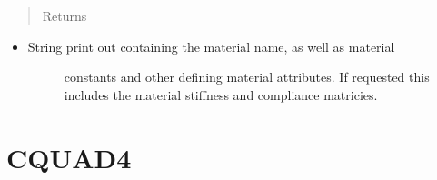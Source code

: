 \documentclass[letterpaper,10pt,english]{sphinxmanual}
\begin{document}
\begin{fulllineitems}
\begin{fulllineitems}
\begin{itemize}
\begin{description}
\end{description}

\end{itemize}
\begin{quote}\begin{description}
\item[{Returns}] \leavevmode
\end{description}\end{quote}
\begin{itemize}
\item {} \begin{description}
\item[{String print out containing the material name, as well as material}] \leavevmode
constants and other defining material attributes. If requested
this includes the material stiffness and compliance matricies.

\end{description}

\end{itemize}

\end{fulllineitems}


\end{fulllineitems}



\section{CQUAD4}
\label{structures:cquad4}
\end{document}
